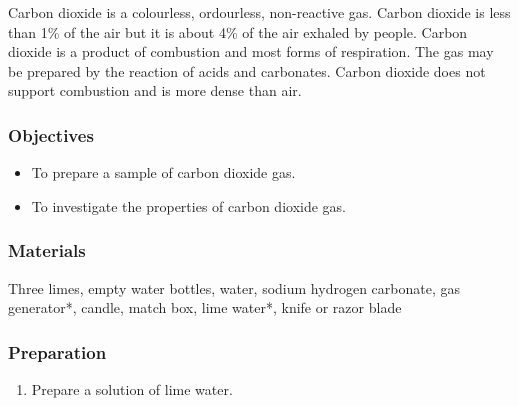 Carbon dioxide is a colourless, ordourless, non-reactive gas. Carbon dioxide is less than 1\% of the air but it is about 4\% of the air exhaled by people. Carbon dioxide is a product of combustion and most forms of respiration. The gas may be prepared by the reaction of acids and carbonates. Carbon dioxide does not support combustion and is more dense than air.

\subsubsection*{Objectives}
\begin{itemize}
\item{To prepare a sample of carbon dioxide gas.}
\item{To investigate the properties of carbon dioxide gas.}
\end{itemize}

\subsubsection*{Materials}
Three limes, empty water bottles, water, sodium hydrogen carbonate, gas generator*, candle, match box, lime water*, knife or razor blade

\subsubsection*{Preparation}
\begin{enumerate}
\item{Prepare a solution of lime water.}
\end{enumerate}


